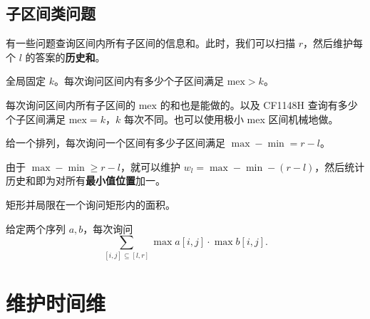 \subsection{子区间类问题}
有一些问题查询区间内所有子区间的信息和。此时，我们可以扫描 $r$，然后维护每个 $l$ 的答案的\textbf{历史和}。

\begin{example}
    全局固定 $k$。每次询问区间内有多少个子区间满足 $\mathrm{mex}>k$。
\end{example}
\begin{remark}
    每次询问区间内所有子区间的 $\mathrm{mex}$ 的和也是能做的。以及 CF1148H 查询有多少个子区间满足 $\mathrm{mex}=k$，$k$ 每次不同。也可以使用极小 mex 区间机械地做。
\end{remark}

\begin{example}
    给一个排列，每次询问一个区间有多少子区间满足 $\max-\min=r-l$。
    \begin{hint}
        由于 $\max-\min\ge r-l$，就可以维护 $w_l=\max-\min-(r-l)$，然后统计历史和即为对所有\textbf{最小值位置}加一。
    \end{hint}
\end{example}

\begin{example}[带有询问矩形的矩形面积并]
    矩形并局限在一个询问矩形内的面积。
\end{example}

\begin{example}[NOIP 2022 比赛]
    给定两个序列 $a,b$，每次询问
    $$
    \sum_{[i,j]\subseteq [l,r]}\max a[i,j]\cdot\max b[i,j].
    $$
\end{example}

\section{维护时间维}

